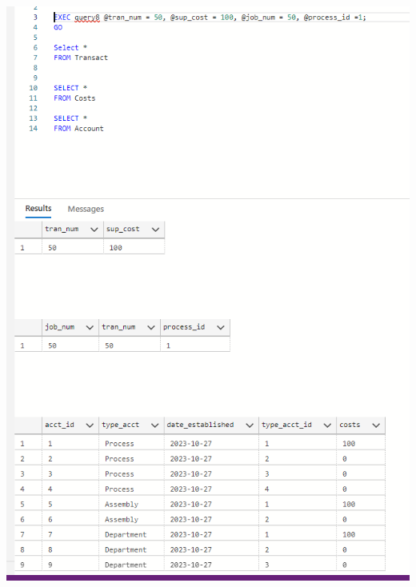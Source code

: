 \documentclass[11pt]{article}
\begin{document}
\begin{enumerate}
\includegraphics[width = \textwidth]{transact.png}


\end{enumerate}
\end{document}

